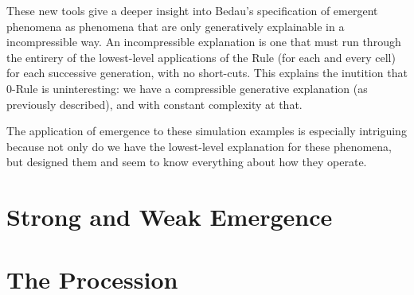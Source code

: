 \documentclass{article}
\begin{document}
These new tools give a deeper insight into Bedau's specification of emergent phenomena as phenomena that are only generatively explainable in a incompressible way. An incompressible explanation is one that must run through the entirery of the lowest-level applications of the Rule (for each and every cell) for each successive generation, with no short-cuts. This explains the inutition that $0$-Rule is uninteresting: we have a compressible generative explanation (as previously described), and with constant complexity at that.


The application of emergence to these simulation examples is especially intriguing because not only do we have the lowest-level explanation for these phenomena, but designed them and seem to know everything about how they operate. 

\section{Strong and Weak Emergence}

\section{The Procession}

\newpage
\end{document}
